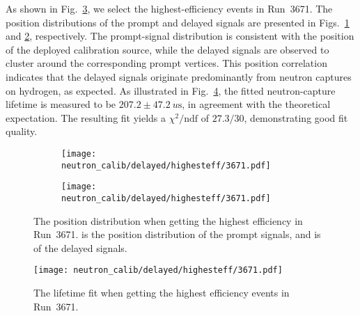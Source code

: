 As shown in Fig.~\ref{fig:highestEffPos}, we select the highest-efficiency events in Run~3671.
The position distributions of the prompt and delayed signals are presented in Figs.~\ref{fig:3671HighestEffProPos} and \ref{fig:3671HighestEffDelPos}, respectively.
The prompt-signal distribution is consistent with the position of the deployed calibration source, while the delayed signals are observed to cluster around the corresponding prompt vertices.
This position correlation indicates that the delayed signals originate predominantly from neutron captures on hydrogen, as expected.
As illustrated in Fig.~\ref{fig:3671_HighestEffDtFit}, the fitted neutron-capture lifetime is measured to be $207.2 \pm \SI{47.2}{u\second}$, in agreement with the theoretical expectation.
The resulting fit yields a $\chi^{2}/\mathrm{ndf}$ of $27.3/30$, demonstrating good fit quality.

\begin{figure}[htbp]
	\begin{subfigure}{0.5\textwidth}
		\centering
		\texttt{[image: neutron\_calib/delayed/highesteff/3671.pdf]}
		\caption{}
		\label{fig:3671HighestEffProPos}
	\end{subfigure}%
	\begin{subfigure}{0.5\textwidth}
		\centering
		\texttt{[image: neutron\_calib/delayed/highesteff/3671.pdf]}
		\caption{}
		\label{fig:3671HighestEffDelPos}
	\end{subfigure}
	\caption{The position distribution when getting the highest efficiency in Run~3671.  is the position distribution of the prompt signals, and  is of the delayed signals.}
	\label{fig:highestEffPos}
\end{figure}
\begin{figure}[H]
	\centering
	\texttt{[image: neutron\_calib/delayed/highesteff/3671.pdf]}
	\caption{The lifetime fit when getting the highest efficiency events in Run~3671.}
	\label{fig:3671_HighestEffDtFit}
\end{figure}

